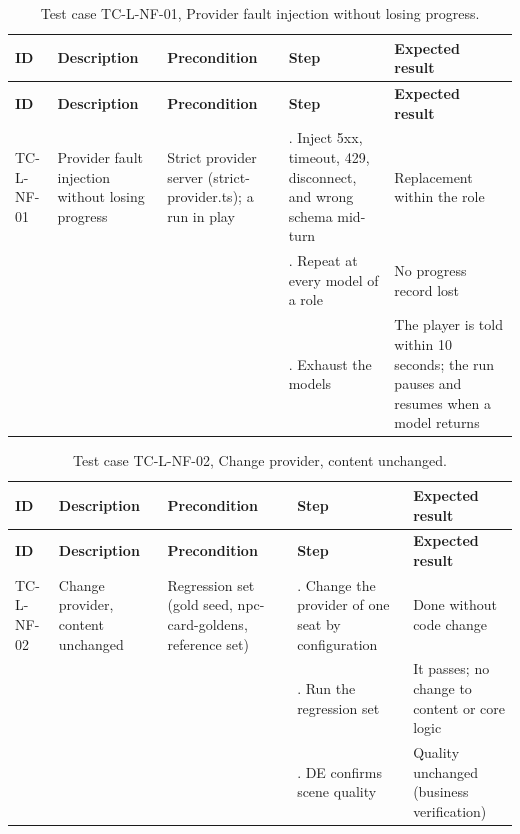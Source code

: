 {\small
\begin{longtable}{|>{\raggedright\arraybackslash}p{}|>{\raggedright\arraybackslash}p{}|>{\raggedright\arraybackslash}p{}|>{\raggedright\arraybackslash}p{}|>{\raggedright\arraybackslash}p{}|}
\caption{Test case TC-L-NF-01, Provider fault injection without losing progress.} \\
\hline
\textbf{ID} & \textbf{Description} & \textbf{Precondition} & \textbf{Step} & \textbf{Expected result} \\ \hline
\endfirsthead
\hline
\textbf{ID} & \textbf{Description} & \textbf{Precondition} & \textbf{Step} & \textbf{Expected result} \\ \hline
\endhead
TC-L-NF-01 & Provider fault injection without losing progress & Strict provider server (strict-provider.ts); a run in play & 1. Inject 5xx, timeout, 429, disconnect, and wrong schema mid-turn & Replacement within the role \\ \hline
 &  &  & 2. Repeat at every model of a role & No progress record lost \\ \hline
 &  &  & 3. Exhaust the models & The player is told within 10 seconds; the run pauses and resumes when a model returns \\ \hline
\end{longtable}
}

{\small
\begin{longtable}{|>{\raggedright\arraybackslash}p{}|>{\raggedright\arraybackslash}p{}|>{\raggedright\arraybackslash}p{}|>{\raggedright\arraybackslash}p{}|>{\raggedright\arraybackslash}p{}|}
\caption{Test case TC-L-NF-02, Change provider, content unchanged.} \\
\hline
\textbf{ID} & \textbf{Description} & \textbf{Precondition} & \textbf{Step} & \textbf{Expected result} \\ \hline
\endfirsthead
\hline
\textbf{ID} & \textbf{Description} & \textbf{Precondition} & \textbf{Step} & \textbf{Expected result} \\ \hline
\endhead
TC-L-NF-02 & Change provider, content unchanged & Regression set (gold seed, npc-card-goldens, reference set) & 1. Change the provider of one seat by configuration & Done without code change \\ \hline
 &  &  & 2. Run the regression set & It passes; no change to content or core logic \\ \hline
 &  &  & 3. DE confirms scene quality & Quality unchanged (business verification) \\ \hline
\end{longtable}
}

